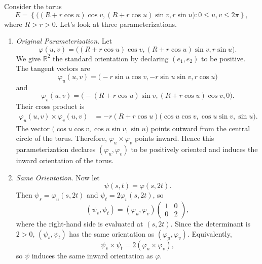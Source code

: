 	\begin{example}
	  \label{ex:orientation-of-a-torus-in-r3}
		Consider the torus
		\begin{equation}
			E =
			\left\{
			\big((R+r\cos u)\cos v,(R+r\cos u)\sin v,r\sin u\big)
			:
			0 \leq u,v \leq 2\pi
			\right\},
		\end{equation}
		where $R>r>0$. Let's look at three parameterizations.
		\begin{enumerate}
			\item \textit{Original Parameterization}. Let
				\begin{equation}
					\varphi(u,v)
					=
					\big((R+r\cos u)\cos v,(R+r\cos u)\sin v,r\sin u\big).
				\end{equation}
				We give $\mathbb{R}^2$ the standard orientation by declaring $(e_1,e_2)$ to be positive. The tangent vectors are
				\begin{equation}
					\varphi_u(u,v)
					=
					\big(-r\sin u\cos v,-r\sin u\sin v,r\cos u\big)
				\end{equation}
				and
				\begin{equation}
					\varphi_v(u,v)
					=
					\big(-(R+r\cos u)\sin v,(R+r\cos u)\cos v,0\big).
				\end{equation}
				Their cross product is
				\begin{align}
					\varphi_u(u,v) \times \varphi_v(u,v)
					&=
					-r(R+r\cos u)\big(\cos u\cos v,\cos u\sin v,\sin u\big).
				\end{align}
				The vector $\big(\cos u\cos v,\cos u\sin v,\sin u\big)$ points outward from the central circle of the torus. Therefore, $\varphi_u \times \varphi_v$ points inward. Hence this parameterization declares $(\varphi_u,\varphi_v)$ to be positively oriented and induces the inward orientation of the torus.

			\item \textit{Same Orientation}. Now let
				\begin{equation}
					\psi(s,t)=\varphi(s,2t).
				\end{equation}
				Then $\psi_s=\varphi_u(s,2t)$ and $\psi_t=2\varphi_v(s,2t)$, so
				\begin{equation}
					(\psi_s,\psi_t)
					=
					(\varphi_u,\varphi_v)
					\begin{pmatrix}
					1 & 0 \\
					0 & 2
					\end{pmatrix},
				\end{equation}
				where the right-hand side is evaluated at $(s,2t)$. Since the determinant is $2>0$, $(\psi_s,\psi_t)$ has the same orientation as $(\varphi_u,\varphi_v)$. Equivalently,
				\begin{equation}
					\psi_s \times \psi_t = 2(\varphi_u \times \varphi_v),
				\end{equation}
				so $\psi$ induces the same inward orientation as $\varphi$.


\end{enumerate}
\end{example}
